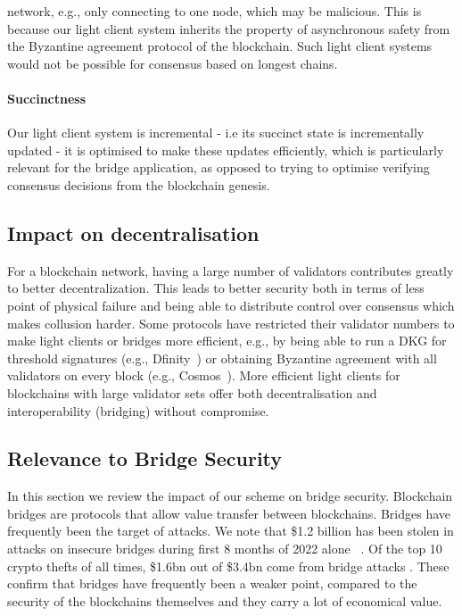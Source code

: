 network, e.g., only connecting to one node, which may be malicious. This is because our light client system inherits the property of asynchronous safety from the Byzantine agreement 
protocol of the blockchain. Such light client systems would not be possible for consensus based on longest chains.  
\vspace{-0.2cm}
\noindent\paragraph{Succinctness}Our light client system is incremental - i.e its succinct state is incrementally updated - it is optimised to make these updates efficiently, which is particularly relevant for the bridge application, as opposed to trying to optimise verifying consensus decisions from the blockchain genesis.
\vspace{-0.2cm}
\subsection{Impact on decentralisation} For a blockchain network, having  a large number of validators  contributes greatly to better decentralization. This leads to better security both in terms of less point of physical failure and being able to distribute control over consensus which makes collusion harder. Some protocols have restricted their validator numbers to make light clients or bridges more efficient, e.g., by being able to run a DKG for threshold signatures (e.g., Dfinity~\cite{dfinity}) or obtaining Byzantine agreement with all validators on every block (e.g., Cosmos~\cite{tendermint_paper}). More efficient light clients for blockchains with large validator sets offer both decentralisation and interoperability (bridging) without compromise.

\vspace{-0.25cm}
\subsection{Relevance to Bridge Security} 
\noindent In this section we review the impact of our scheme on bridge security. Blockchain bridges are protocols that allow value transfer between blockchains. Bridges have frequently been the target of attacks. We note that \$1.2 billion has been stolen in attacks on insecure bridges during first 8 months of 2022 alone ~\cite{elliptic_harmony,elliptic_nomad}. Of the top 10 crypto thefts of all times, \$1.6bn out of \$3.4bn come from bridge attacks \cite{elliptic_nomad}. These confirm that bridges have frequently been a weaker point, compared to the security of the blockchains themselves and they carry a lot of economical value.

